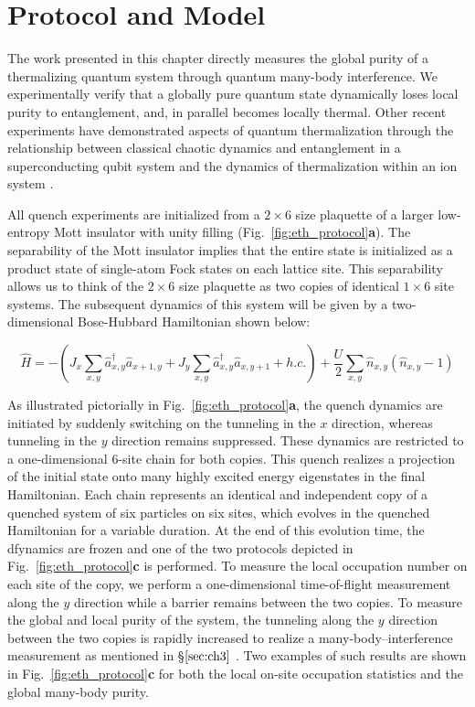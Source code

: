 \section{Protocol and Model}
\label{sec:ch4protocol}

The work presented in this chapter directly measures the global purity of a thermalizing quantum system through quantum many-body interference\cite{Daley2012,Islam2015,Kaufman2016}. We experimentally verify that a globally pure quantum state dynamically loses local purity to entanglement, and, in parallel becomes locally thermal. Other recent experiments have demonstrated aspects of quantum thermalization through the relationship between classical chaotic dynamics and entanglement in a superconducting qubit system\cite{Neill2016} and the dynamics of thermalization within an ion system \cite{Clos2016}.

All quench experiments are initialized from a $2\times6$ size plaquette of a larger low-entropy Mott insulator with unity filling (Fig.~\ref{fig:eth_protocol}\textbf{a}). The separability of the Mott insulator implies that the entire state is initialized as a product state of single-atom Fock states on each lattice site. This separability allows us to think of the $2\times6$ size plaquette as two copies of identical $1\times6$ site systems. The subsequent dynamics of this system will be given by a two-dimensional Bose-Hubbard Hamiltonian shown below:

\begin{equation}
\label{eqn:hjx}
\hat{H} = -(J_x \sum_{x,y} \hat{a}^\dagger_{x,y} \hat{a}_{x+1,y} + J_y \sum_{x,y} \hat{a}^\dagger_{x,y}\hat{a}_{x,y+1} + h.c. ) + \frac{U}{2} \sum_{x,y} \hat{n}_{x,y} (\hat{n}_{x,y}-1)
\end{equation}

As illustrated pictorially in Fig.~\ref{fig:eth_protocol}\textbf{a}, the quench dynamics are initiated by suddenly switching on the tunneling in the $x$ direction, whereas tunneling in the $y$ direction remains suppressed. These dynamics are restricted to a one-dimensional 6-site chain for both copies. This quench realizes a projection of the initial state onto many highly excited energy eigenstates in the final Hamiltonian. Each chain represents an identical and independent copy of a quenched system of six particles on six sites, which evolves in the quenched Hamiltonian for a variable duration. At the end of this evolution time, the dfynamics are frozen and one of the two protocols depicted in Fig.~\ref{fig:eth_protocol}\textbf{c} is performed. To measure the local occupation number on each site of the copy, we perform a one-dimensional time-of-flight measurement along the $y$ direction while a barrier remains between the two copies. To measure the global and local purity of the system, the tunneling along the $y$ direction between the two copies is rapidly increased to realize a many-body--interference measurement as mentioned in \S $\ref{sec:ch3}$ \cite{Islam2015}. Two examples of such results are shown in Fig.~\ref{fig:eth_protocol}\textbf{c} for both the local on-site occupation statistics and the global many-body purity.

